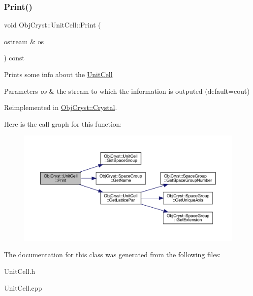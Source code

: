 \subsubsection{\texorpdfstring{Print()}{Print()}}
{\footnotesize\ttfamily void Obj\+Cryst\+::\+Unit\+Cell\+::\+Print (\begin{DoxyParamCaption}\item[{ostream \&}]{os }\end{DoxyParamCaption}) const\hspace{0.3cm}{\ttfamily [virtual]}}

Prints some info about the \mbox{\hyperlink{class_obj_cryst_1_1_unit_cell}{Unit\+Cell}}


\begin{DoxyParams}{Parameters}
{\em os} & the stream to which the information is outputed (default=cout) \\
\hline
\end{DoxyParams}


Reimplemented in \mbox{\hyperlink{class_obj_cryst_1_1_crystal_a086f39272ca94c23ff7819151a9edf37}{Obj\+Cryst\+::\+Crystal}}.

Here is the call graph for this function\+:
\nopagebreak
\begin{figure}[H]
\begin{center}
\leavevmode
\includegraphics[width=350pt]{class_obj_cryst_1_1_unit_cell_a19ef2e012dfd628935a22b40a9c85957_cgraph}
\end{center}
\end{figure}


The documentation for this class was generated from the following files\+:\begin{DoxyCompactItemize}
\item 
Unit\+Cell.\+h\item 
Unit\+Cell.\+cpp\end{DoxyCompactItemize}
